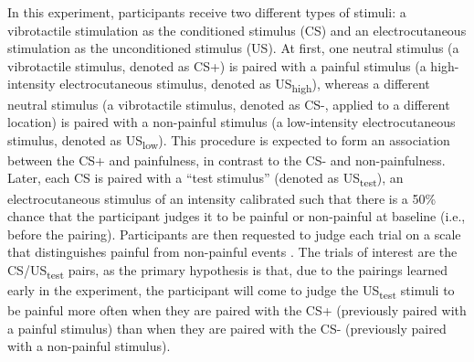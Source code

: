 \documentclass[empirical,issue, twocolumn,authordate]{jote-new-article}
\begin{document}
In this experiment, participants receive two different types of stimuli: a vibrotactile stimulation as the conditioned stimulus (CS) and an electrocutaneous stimulation as the unconditioned stimulus (US). At first, one neutral stimulus (a vibrotactile stimulus, denoted as CS+) is paired with a painful stimulus (a high-intensity electrocutaneous stimulus, denoted as US\textsubscript{high}), whereas a different neutral stimulus (a vibrotactile stimulus, denoted as CS-, applied to a different location) is paired with a non-painful stimulus (a low-intensity electrocutaneous stimulus, denoted as US\textsubscript{low}). This procedure is expected to form an association between the CS+ and painfulness, in contrast to the CS- and non-painfulness. Later, each CS is paired with a “test stimulus” (denoted as US\textsubscript{test}), an electrocutaneous stimulus of an intensity calibrated such that there is a 50\% chance that the participant judges it to be painful or non-painful at baseline (i.e., before the pairing). Participants are then requested to judge each trial on a scale that distinguishes painful from non-painful events \parencite{Madden2019}. The trials of interest are the CS/US\textsubscript{test} pairs, as the primary hypothesis is that, due to the pairings learned early in the experiment, the participant will come to judge the US\textsubscript{test} stimuli to be painful more often when they are paired with the CS+ (previously paired with a painful stimulus) than when they are paired with the CS- (previously paired with a non-painful stimulus).
\end{document}
